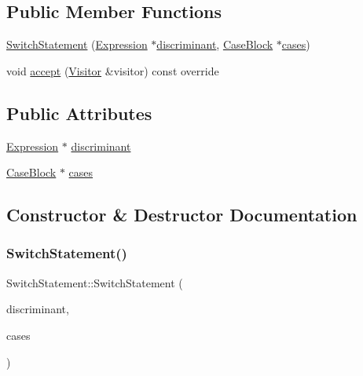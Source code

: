 \subsection*{Public Member Functions}
\begin{DoxyCompactItemize}
\item 
\hyperlink{struct_switch_statement_adab42f2a56bc686f522587ff6f39b70a}{Switch\+Statement} (\hyperlink{struct_expression}{Expression} $\ast$\hyperlink{struct_switch_statement_a6b04149d29751485e93c698298ebbe5d}{discriminant}, \hyperlink{struct_case_block}{Case\+Block} $\ast$\hyperlink{struct_switch_statement_a2e2f296ddcb9fcb69bd4daeac8c850b0}{cases})
\item 
void \hyperlink{struct_switch_statement_a948b1d975437e623ad183d5599ce51f9}{accept} (\hyperlink{struct_visitor}{Visitor} \&visitor) const override
\end{DoxyCompactItemize}
\subsection*{Public Attributes}
\begin{DoxyCompactItemize}
\item 
\hyperlink{struct_expression}{Expression} $\ast$ \hyperlink{struct_switch_statement_a6b04149d29751485e93c698298ebbe5d}{discriminant}
\item 
\hyperlink{struct_case_block}{Case\+Block} $\ast$ \hyperlink{struct_switch_statement_a2e2f296ddcb9fcb69bd4daeac8c850b0}{cases}
\end{DoxyCompactItemize}


\subsection{Constructor \& Destructor Documentation}
\mbox{\label{struct_switch_statement_adab42f2a56bc686f522587ff6f39b70a}} 
\subsubsection{\texorpdfstring{Switch\+Statement()}{SwitchStatement()}}
{\footnotesize\ttfamily Switch\+Statement\+::\+Switch\+Statement (\begin{DoxyParamCaption}\item[{\hyperlink{struct_expression}{Expression} $\ast$}]{discriminant,  }\item[{\hyperlink{struct_case_block}{Case\+Block} $\ast$}]{cases }\end{DoxyParamCaption})\hspace{0.3cm}{\ttfamily [inline]}}



